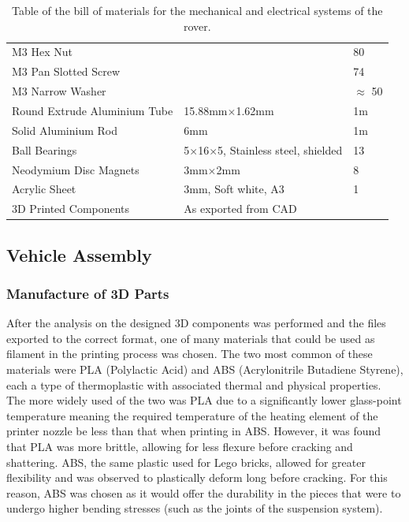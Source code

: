 \begin{table}[H]
\begin{tabular}{@{}lll@{}}
    M3 Hex Nut                         &                                                 & 80            \\
    M3 Pan Slotted Screw               &                                                 & 74            \\
    M3 Narrow Washer                   &                                                 & $\approx$ 50  \\
    Round Extrude Aluminium Tube       & 15.88mm$\times$1.62mm                           & 1m            \\
    Solid Aluminium Rod                & 6mm                                             & 1m            \\
    Ball Bearings                      & 5$\times$16$\times$5, Stainless steel, shielded & 13            \\
    Neodymium Disc Magnets             & 3mm$\times$2mm                                  & 8             \\
    Acrylic Sheet                      & 3mm, Soft white, A3                             & 1             \\
    3D Printed Components              & As exported from CAD                            &               \\ \bottomrule
    \end{tabular}
    \caption{Table of the bill of materials for the mechanical and electrical systems of the rover.}
    \label{tab:BOM}
    \end{table}
  
  \subsection{Vehicle Assembly}
    \subsubsection{Manufacture of 3D Parts}
      After the analysis on the designed 3D components was performed and the files exported to the correct format, one of many materials that could be used as filament in the printing process was chosen. The two most common of these materials were PLA (Polylactic Acid) and ABS (Acrylonitrile Butadiene Styrene), each a type of thermoplastic with associated thermal and physical properties. The more widely used of the two was PLA due to a significantly lower glass-point temperature meaning the required temperature of the heating element of the printer nozzle be less than that when printing in ABS. However, it was found that PLA was more brittle, allowing for less flexure before cracking and shattering. ABS, the same plastic used for Lego bricks, allowed for greater flexibility and was observed to plastically deform long before cracking. For this reason, ABS was chosen as it would offer the durability in the pieces that were to undergo higher bending stresses (such as the joints of the suspension system).
      
